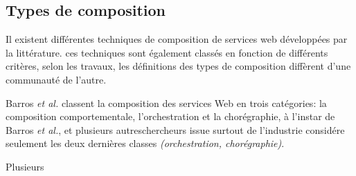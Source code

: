      
    \subsection{Types de composition}
    \label{sec:types-de-composition}

    Il existent différentes techniques de composition de services web
    développées par la littérature. ces techniques sont également
    classés en fonction de différents critères, selon les travaux, les
    définitions des types de composition diffèrent d'une communauté de
    l'autre.

    Barros \emph{et al.} \cite{barros2006standards} classent la
    composition des services Web en trois catégories: la composition
    comportementale, l'orchestration et la chorégraphie, à l'instar de
    Barros \emph{et al.}, \cite{peltz2003web} et plusieurs
    autreschercheurs issue surtout de l'industrie considére seulement
    les deux dernières classes \textit{(orchestration, chorégraphie)}.

  

    Plusieurs





